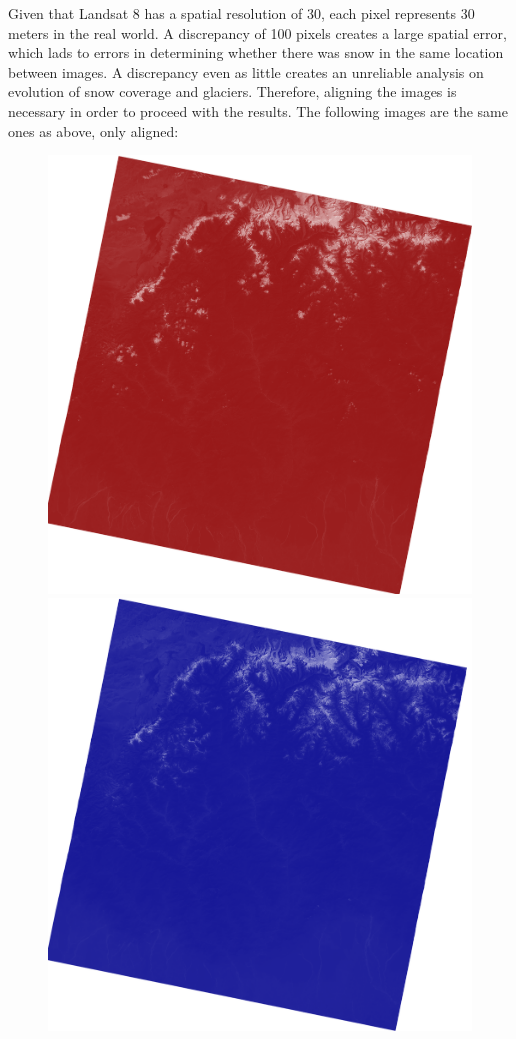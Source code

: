 \documentclass[12pt, a4paper]{report}
\begin{document}
  	Given that Landsat 8 has a spatial resolution of 30, each pixel represents 30 meters in the real world. A discrepancy of 100 pixels creates a large spatial error, which lads to errors in determining whether there was snow in the same location between images. A discrepancy even as little creates an unreliable analysis on evolution of snow coverage and glaciers. Therefore, aligning the images is necessary in order to proceed with the results. The following images are the same ones as above, only aligned:
  	
  	
  	\begin{figure}[H]
  		\includegraphics[width=\linewidth]{red_big_aligned.png}
  		\endminipage\hfill
  		\includegraphics[width=\linewidth]{blue_big_aligned.png}

\end{figure}
\end{document}
